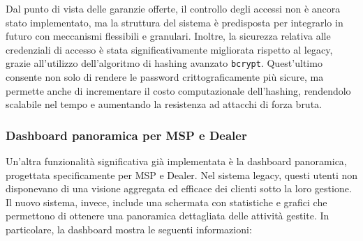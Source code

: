 Dal punto di vista delle garanzie offerte, il controllo degli accessi non è ancora stato implementato, ma la struttura del sistema è predisposta per integrarlo in futuro con meccanismi flessibili e granulari. Inoltre, la sicurezza relativa alle credenziali di accesso è stata significativamente migliorata rispetto al legacy, grazie all’utilizzo dell'algoritmo di hashing avanzato \texttt{bcrypt}. Quest’ultimo consente non solo di rendere le password crittograficamente più sicure, ma permette anche di incrementare il costo computazionale dell’hashing, rendendolo scalabile nel tempo e aumentando la resistenza ad attacchi di forza bruta.

\subsubsection{Dashboard panoramica per MSP e Dealer}
Un'altra funzionalità significativa già implementata è la dashboard panoramica, progettata specificamente per MSP e Dealer. Nel sistema legacy, questi utenti non disponevano di una visione aggregata ed efficace dei clienti sotto la loro gestione. Il nuovo sistema, invece, include una schermata con statistiche e grafici che permettono di ottenere una panoramica dettagliata delle attività gestite. In particolare, la dashboard mostra le seguenti informazioni:

